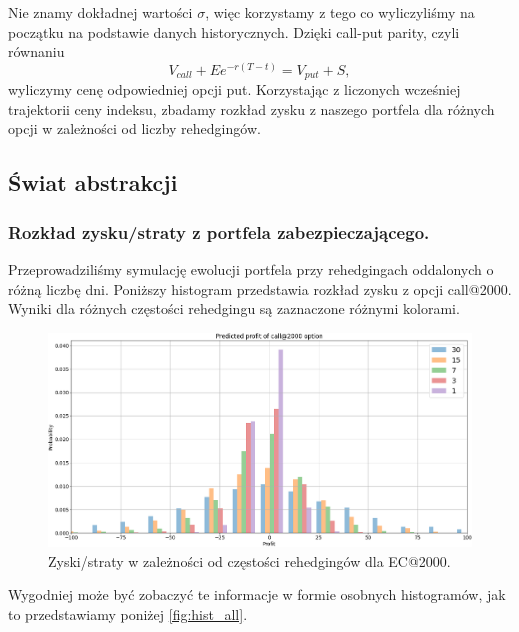 \documentclass[12pt]{article}
\begin{document}
Nie znamy dokładnej wartości $\sigma$, więc korzystamy z tego co wyliczyliśmy na początku na podstawie danych historycznych. Dzięki call-put parity, czyli równaniu $$V_{call}+Ee^{-r(T-t)}=V_{put}+S,$$ wyliczymy cenę odpowiedniej opcji put. Korzystając z liczonych wcześniej trajektorii ceny indeksu, zbadamy rozkład zysku z naszego portfela dla różnych opcji w zależności od liczby rehedgingów.

\subsection{Świat abstrakcji}
\subsubsection{Rozkład zysku/straty z portfela zabezpieczającego.}
Przeprowadziliśmy symulację ewolucji portfela przy rehedgingach oddalonych o różną liczbę dni. Poniższy histogram przedstawia rozkład zysku z opcji call@2000. Wyniki dla różnych częstości rehedgingu są zaznaczone różnymi kolorami.
\begin{figure}[H]
    \centering
    \includegraphics[width=\textwidth,height=\textheight,keepaspectratio]{multi_histogram.png}
    \caption{Zyski/straty w zależności od częstości rehedgingów dla EC@2000.}
    \label{fig:ec2000_hist_zysk}
\end{figure}
Wygodniej może być zobaczyć te informacje w formie osobnych histogramów, jak to przedstawiamy poniżej \ref{fig:hist_all}.\\
\end{document}
